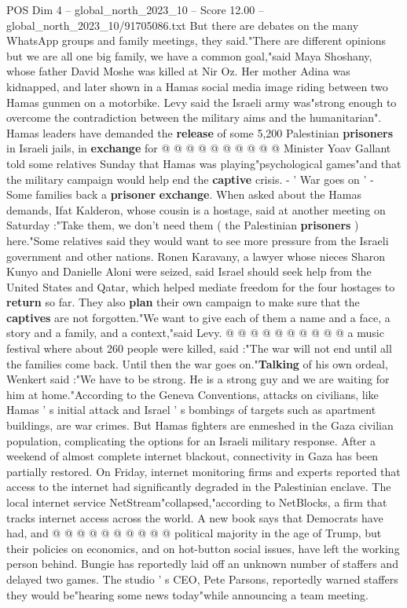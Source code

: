 \begin{textsample}{POS Dim 4 – global\_north\_2023\_10 – Score 12.00 – global\_north\_2023\_10/91705086.txt}
But there are debates on the many WhatsApp groups and family meetings, they said."There are different opinions but we are all one big family, we have a common goal,"said Maya Shoshany, whose father David Moshe was killed at Nir Oz.
Her mother Adina was kidnapped, and later shown in a Hamas social media image riding between two Hamas gunmen on a motorbike.
Levy said the Israeli army was"strong enough to overcome the contradiction between the military aims and the humanitarian".
Hamas leaders have demanded the \textbf{release} of some 5,200 Palestinian \textbf{prisoners} in Israeli jails, in \textbf{exchange} for @ @ @ @ @ @ @ @ @ @ Minister Yoav Gallant told some relatives Sunday that Hamas was playing"psychological games"and that the military campaign would help end the \textbf{captive} crisis. - ' War goes on ' - Some families back a \textbf{prisoner} \textbf{exchange}.
When asked about the Hamas demands, Ifat Kalderon, whose cousin is a hostage, said at another meeting on Saturday :"Take them, we don't need them ( the Palestinian \textbf{prisoners} ) here."Some relatives said they would want to see more pressure from the Israeli government and other nations.
Ronen Karavany, a lawyer whose nieces Sharon Kunyo and Danielle Aloni were seized, said Israel should seek help from the United States and Qatar, which helped mediate freedom for the four hostages to \textbf{return} so far.
They also \textbf{plan} their own campaign to make sure that the \textbf{captives} are not forgotten."We want to give each of them a name and a face, a story and a family, and a context,"said Levy. @ @ @ @ @ @ @ @ @ @ a music festival where about 260 people were killed, said :"The war will not end until all the families come back.
Until then the war goes on."\textbf{Talking} of his own ordeal, Wenkert said :"We have to be strong.
He is a strong guy and we are waiting for him at home."According to the Geneva Conventions, attacks on civilians, like Hamas ' s initial attack and Israel ' s bombings of targets such as apartment buildings, are war crimes.
But Hamas fighters are enmeshed in the Gaza civilian population, complicating the options for an Israeli military response.
After a weekend of almost complete internet blackout, connectivity in Gaza has been partially restored.
On Friday, internet monitoring firms and experts reported that access to the internet had significantly degraded in the Palestinian enclave.
The local internet service NetStream"collapsed,"according to NetBlocks, a firm that tracks internet access across the world.
A new book says that Democrats have had, and @ @ @ @ @ @ @ @ @ @ political majority in the age of Trump, but their policies on economics, and on hot-button social issues, have left the working person behind.
Bungie has reportedly laid off an unknown number of staffers and delayed two games.
The studio ' s CEO, Pete Parsons, reportedly warned staffers they would be"hearing some news today"while announcing a team meeting.

\end{textsample}
